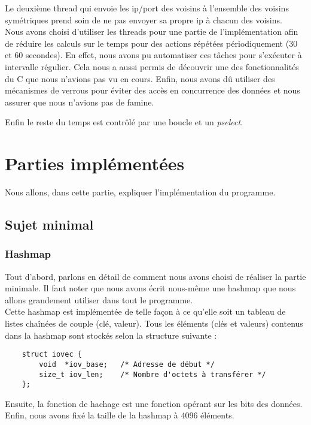 \documentclass{FR16}
\begin{document}
Le deuxième thread qui envoie les ip/port des voisins à l'ensemble des voisins symétriques prend soin de ne pas envoyer sa propre ip à chacun des voisins.  \\

Nous avons choisi d'utiliser les threads pour une partie de l'implémentation afin de réduire les calculs sur le temps pour des actions répétées périodiquement (30 et 60 secondes). En effet, nous avons pu automatiser ces tâches pour s'exécuter à intervalle régulier. Cela nous a aussi permis de découvrir une des fonctionnalités du C que nous n'avions pas vu en cours. Enfin, nous avons dû utiliser des mécanismes de verrous pour éviter des accès en concurrence des données et nous assurer que nous n'avions pas de famine.

Enfin le reste du temps est contrôlé par une boucle et un \textit{pselect}. \\

\newpage



\section{Parties implémentées}
Nous allons, dans cette partie, expliquer l'implémentation du programme.
\subsection{Sujet minimal}
\subsubsection{Hashmap}
Tout d'abord, parlons en détail de comment nous avons choisi de réaliser la partie minimale. Il faut noter que nous avons écrit nous-même une hashmap que nous allons grandement utiliser dans tout le programme.\\
Cette hashmap est implémentée de telle façon à ce qu'elle soit un tableau de listes chaînées de couple (clé, valeur). Tous les éléments (clés et valeurs) contenus dans la hashmap sont stockés selon la structure suivante :
\begin{verbatim}
    struct iovec {
        void  *iov_base;   /* Adresse de début */
        size_t iov_len;    /* Nombre d'octets à transférer */
    };
\end{verbatim}
Ensuite, la fonction de hachage est une fonction opérant sur les bits des données. Enfin, nous avons fixé la taille de la hashmap à 4096 éléments.
\end{document}
